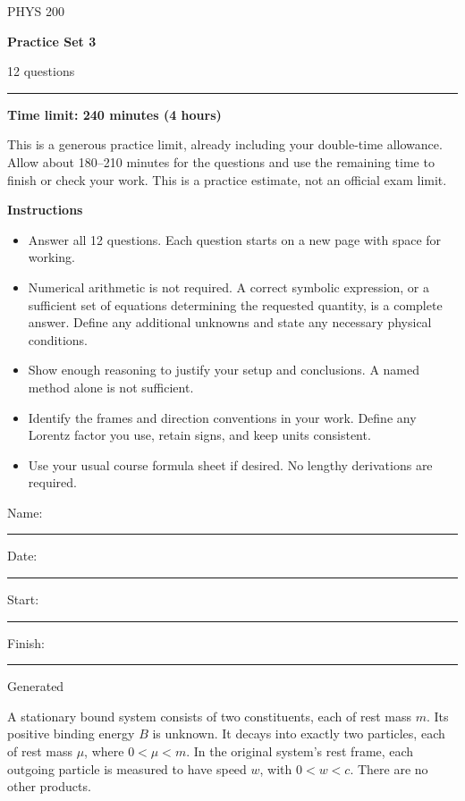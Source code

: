 \documentclass[12pt,letterpaper]{article}
\newcommand{\question}[1]{\noindent{\large\bfseries #1.}\hfill{\small Generated}\par\medskip}
\begin{document}
\begin{titlepage}
\thispagestyle{empty}
\vspace*{0.6in}
{\Large PHYS 200\par}
\vspace{0.25in}
{\Huge\bfseries Practice Set 3\par}
\vspace{0.18in}
{\large 12 questions\par}
\vspace{0.4in}
\hrule
\vspace{0.25in}
{\Large\bfseries Time limit: 240 minutes (4 hours)\par}
This is a generous practice limit, already including your double-time allowance.
Allow about 180--210 minutes for the questions and use the remaining time to
finish or check your work. This is a practice estimate, not an official exam limit.
\vspace{0.2in}

\textbf{Instructions}
\begin{itemize}
\setlength{\itemsep}{0.55em}
\item Answer all 12 questions. Each question starts on a new page with space for working.
\item Numerical arithmetic is not required. A correct symbolic expression, or
a sufficient set of equations determining the requested quantity, is a complete
answer. Define any additional unknowns and state any necessary physical conditions.
\item Show enough reasoning to justify your setup and conclusions. A named
method alone is not sufficient.
\item Identify the frames and direction conventions in your work. Define any
Lorentz factor you use, retain signs, and keep units consistent.
\item Use your usual course formula sheet if desired. No lengthy derivations
are required.
\end{itemize}

\vfill
Name:\ \rule{3.6in}{0.4pt}

Date:\ \rule{1.6in}{0.4pt}
\hfill Start:\ \rule{1.1in}{0.4pt}
\quad Finish:\ \rule{1.1in}{0.4pt}
\vspace*{0.2in}
\end{titlepage}
\setcounter{page}{1}

\question{1}
A stationary bound system consists of two constituents, each of rest mass $m$.
Its positive binding energy $B$ is unknown. It decays into exactly two particles,
each of rest mass $\mu$, where $0<\mu<m$. In the original system's rest frame,
each outgoing particle is measured to have speed $w$, with $0<w<c$.
There are no other products.
\end{document}
